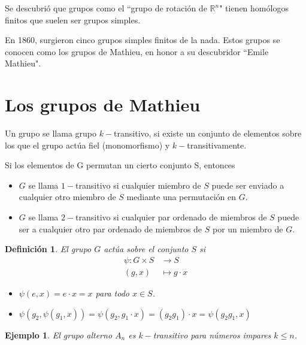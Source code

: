 \documentclass{article}
\numberwithin{equation}{section}
\theoremstyle{plain}  %
\newtheorem{Def}{Definición}[section]
\newtheorem{Ej}{Ejemplo}[section]
\begin{document}
Se descubrió que grupos como el ``grupo de rotación de $\mathbb{R}^n$" tienen homólogos finitos que suelen ser grupos simples.\newline

En 1860, surgieron cinco grupos simples finitos de la nada. Estos grupos se conocen como los grupos de Mathieu, en honor a su descubridor ``Emile Mathieu".
\section{Los grupos de Mathieu}
Un grupo se llama grupo $k-$transitivo, si existe un conjunto de elementos sobre los que el grupo actúa fiel (monomorfismo) y $k-$transitivamente.\newline

Si los elementos de G permutan un cierto conjunto S, entonces\newline
\begin{itemize}
    \item $G$ se llama $1-$transitivo si cualquier miembro de $S$ puede ser enviado a cualquier otro miembro de $S$ mediante una permutación en $G$.\newline
    
    \item  $G$ se llama $2-$transitivo si cualquier par ordenado de miembros de $S$ puede ser a cualquier otro par ordenado de miembros de $S$ por un miembro de $G$.
\end{itemize}
\begin{Def}
    El grupo $G$ actúa sobre el conjunto $S$ si
\begin{equation*}
\begin{split}
    \psi:G\times S &\longrightarrow S\\
       (g,x) &\longmapsto g\cdot x
\end{split}
\end{equation*}
\begin{itemize}
    \item[1.] $\psi(e,x) = e\cdot x = x$ para todo $x\in S$.
    \item[2.] $\psi(g_2,\psi(g_1,x)) = \psi(g_2,g_1\cdot x) = (g_2g_1)\cdot x = \psi(g_2g_1, x) $
\end{itemize}
\end{Def}
\begin{Ej}
    El grupo alterno $A_n$ es $k-$transitivo para números impares $k\leq n$.
\end{Ej}
\end{document}
